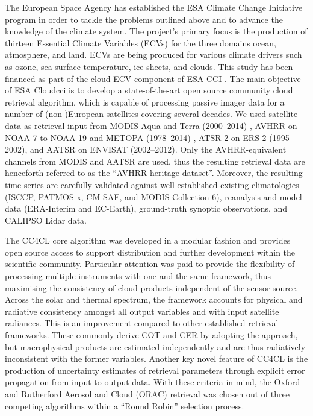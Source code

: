 The European Space Agency has established the ESA Climate Change Initiative program \citep{ESA_CCI_web,Hollmann13} in order to tackle the problems outlined above and to advance the knowledge of the climate system. The project's primary focus is the production of thirteen Essential Climate Variables (ECVs) for the three domains ocean, atmosphere, and land. ECVs are being produced for various climate drivers such as ozone, sea surface temperature, ice sheets, and clouds. This study has been financed as part of the cloud ECV component of ESA CCI \citep{ESA_Cloud_CCI_web}. The main objective of ESA Cloud\textunderscore cci is to develop a state-of-the-art open source community cloud retrieval algorithm, which is capable of processing passive imager data for a number of \mbox{(non-)European} satellites covering several decades. We used satellite data as retrieval input from MODIS Aqua and Terra (2000--2014) \citep{King92}, AVHRR on NOAA-7 to NOAA-19 and METOPA (1978--2014) \citep{Jacobowitz03}, ATSR-2 on ERS-2 (1995--2002), and AATSR on ENVISAT (2002--2012). Only the AVHRR-equivalent channels from MODIS and AATSR are used, thus the resulting retrieval data are henceforth referred to as the ``AVHRR heritage dataset''. Moreover, the resulting time series are carefully validated against well established existing climatologies (ISCCP, PATMOS-x, CM SAF, and MODIS Collection 6), reanalysis and model data (ERA-Interim and EC-Earth), ground-truth synoptic observations, and CALIPSO Lidar data.

The CC4CL core algorithm was developed in a modular fashion and provides open source access to support distribution and further development within the scientific community. Particular attention was paid to provide the flexibility of processing multiple instruments with one and the same framework, thus maximising the consistency of cloud products independent of the sensor source. Across the solar and thermal spectrum, the framework accounts for physical and radiative consistency amongst all output variables and with input satellite radiances. This is an improvement compared to other established retrieval frameworks. These commonly derive COT and CER by adopting the \citet{Nakajima90} approach, but macrophysical products are estimated independently and are thus radiatively inconsistent with the former variables. Another key novel feature of CC4CL is the production of uncertainty estimates of retrieval parameters through explicit error propagation from input to output data. With these criteria in mind, the Oxford and Rutherford Aerosol and Cloud (ORAC) retrieval \citep{Thomas09, Poulsen12} was chosen out of three competing algorithms within a ``Round Robin'' selection process. 

